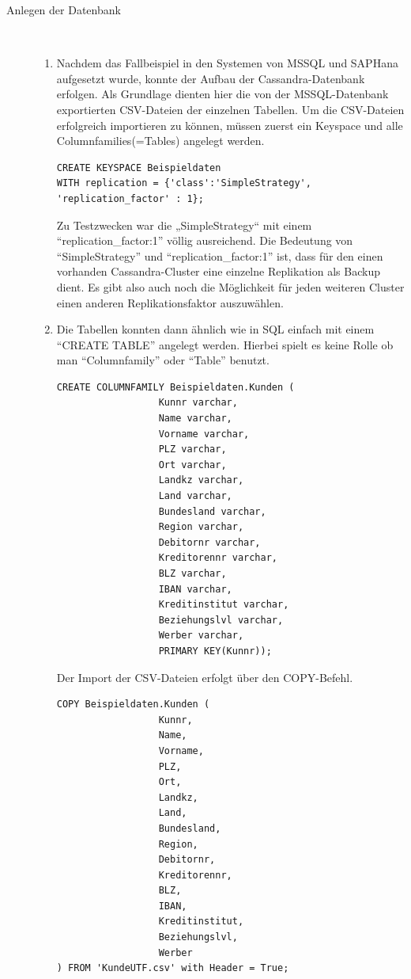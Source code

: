 \documentclass[a4paper, 12pt]{scrartcl}
\begin{document}
\begin{description}
   \item[Anlegen der Datenbank]~\par
   \begin{enumerate}
      \item Nachdem das Fallbeispiel in den Systemen von MSSQL und SAPHana aufgesetzt wurde, konnte der Aufbau der Cassandra-Datenbank erfolgen. Als Grundlage dienten hier die von der MSSQL-Datenbank exportierten CSV-Dateien der einzelnen Tabellen. Um die CSV-Dateien erfolgreich importieren zu können, müssen zuerst ein Keyspace und alle Columnfamilies(=Tables) angelegt werden.
      \begin{verbatim}
CREATE KEYSPACE Beispieldaten
WITH replication = {'class':'SimpleStrategy', 'replication_factor' : 1};  	
      \end{verbatim}
		Zu Testzwecken war die „SimpleStrategy“ mit einem "`replication_factor:1"' völlig ausreichend. Die Bedeutung von "`SimpleStrategy"' und "`replication_factor:1"' ist, dass für den einen vorhanden Cassandra-Cluster eine einzelne Replikation als Backup dient.
Es gibt also auch noch die Möglichkeit für jeden weiteren Cluster einen anderen Replikationsfaktor auszuwählen. 

      \item Die Tabellen konnten dann ähnlich wie in SQL einfach mit einem "`CREATE TABLE"' angelegt werden. Hierbei spielt es keine Rolle ob man "`Columnfamily"' oder "`Table"' benutzt.
      \begin{verbatim}
CREATE COLUMNFAMILY Beispieldaten.Kunden (
				  Kunnr varchar,
				  Name varchar,
				  Vorname varchar,
				  PLZ varchar,
				  Ort varchar,
				  Landkz varchar,
				  Land varchar,
				  Bundesland varchar,
				  Region varchar,
				  Debitornr varchar,
				  Kreditorennr varchar,
				  BLZ varchar,
				  IBAN varchar,
				  Kreditinstitut varchar,
				  Beziehungslvl varchar,
				  Werber varchar,
				  PRIMARY KEY(Kunnr));       
      \end{verbatim}
      Der Import der CSV-Dateien erfolgt über den COPY-Befehl.
      \begin{verbatim}
COPY Beispieldaten.Kunden ( 
				  Kunnr,
				  Name,
				  Vorname,
				  PLZ,
				  Ort,
				  Landkz,
				  Land,
				  Bundesland,
				  Region,
				  Debitornr,
				  Kreditorennr,
				  BLZ,
				  IBAN,
				  Kreditinstitut,
				  Beziehungslvl,
				  Werber
) FROM 'KundeUTF.csv' with Header = True; 
      \end{verbatim}		
   \end{enumerate}  
  
\end{description}
\end{document}
